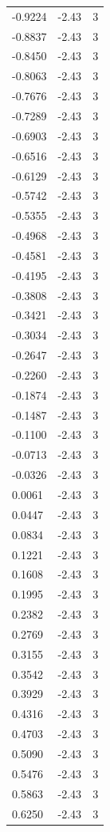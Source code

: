 \begin{longtable}{lrr}
  -0.9224 & -2.43 & 3 \\
  -0.8837 & -2.43 & 3 \\
  -0.8450 & -2.43 & 3 \\
  -0.8063 & -2.43 & 3 \\
  -0.7676 & -2.43 & 3 \\
  -0.7289 & -2.43 & 3 \\
  -0.6903 & -2.43 & 3 \\
  -0.6516 & -2.43 & 3 \\
  -0.6129 & -2.43 & 3 \\
  -0.5742 & -2.43 & 3 \\
  -0.5355 & -2.43 & 3 \\
  -0.4968 & -2.43 & 3 \\
  -0.4581 & -2.43 & 3 \\
  -0.4195 & -2.43 & 3 \\
  -0.3808 & -2.43 & 3 \\
  -0.3421 & -2.43 & 3 \\
  -0.3034 & -2.43 & 3 \\
  -0.2647 & -2.43 & 3 \\
  -0.2260 & -2.43 & 3 \\
  -0.1874 & -2.43 & 3 \\
  -0.1487 & -2.43 & 3 \\
  -0.1100 & -2.43 & 3 \\
  -0.0713 & -2.43 & 3 \\
  -0.0326 & -2.43 & 3 \\
  0.0061 & -2.43 & 3 \\
  0.0447 & -2.43 & 3 \\
  0.0834 & -2.43 & 3 \\
  0.1221 & -2.43 & 3 \\
  0.1608 & -2.43 & 3 \\
  0.1995 & -2.43 & 3 \\
  0.2382 & -2.43 & 3 \\
  0.2769 & -2.43 & 3 \\
  0.3155 & -2.43 & 3 \\
  0.3542 & -2.43 & 3 \\
  0.3929 & -2.43 & 3 \\
  0.4316 & -2.43 & 3 \\
  0.4703 & -2.43 & 3 \\
  0.5090 & -2.43 & 3 \\
  0.5476 & -2.43 & 3 \\
  0.5863 & -2.43 & 3 \\
  0.6250 & -2.43 & 3 \\

\end{longtable}
